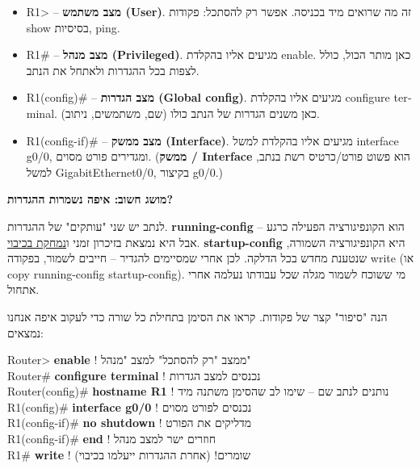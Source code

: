 \documentclass[11pt]{article}
\newcommand{\enLR}[1]{\textenglish{#1}}
\newcommand{\code}[1]{\textenglish{\codefont #1}}
\newcommand{\boxtitle}[1]{{\bfseries\color{boxti}#1}}
\newenvironment{tipbox}{\colorlet{boxti}{tipti}\begin{mdframed}[backgroundcolor=tipbg,linecolor=tipfr,rightline=true,leftline=false,topline=false,bottomline=false,linewidth=2pt,innertopmargin=6pt,innerbottommargin=6pt,innerleftmargin=8pt,innerrightmargin=8pt,skipabove=6pt,skipbelow=6pt]}{\end{mdframed}}
\begin{document}
\begin{itemize}
\item \code{R1>} – \textbf{מצב משתמש \enLR{(User)}}. זה מה שרואים מיד בכניסה. אפשר רק להסתכל: פקודות \code{show} בסיסיות, \code{ping}.
\item \code{R1\#} – \textbf{מצב מנהל \enLR{(Privileged)}}. מגיעים אליו בהקלדת \code{enable}. כאן מותר הכול, כולל לצפות בכל ההגדרות ולאתחל את הנתב.
\item \code{R1(config)\#} – \textbf{מצב הגדרות \enLR{(Global config)}}. מגיעים אליו בהקלדת \code{configure terminal}. כאן משנים הגדרות של הנתב כולו (שם, משתמשים, ניתוב).
\item \code{R1(config-if)\#} – \textbf{מצב ממשק \enLR{(Interface)}}. מגיעים אליו בהקלדת למשל \code{interface g0/0}, ומגדירים פורט מסוים. (\textbf{ממשק / \enLR{Interface}} הוא פשוט פורט/כרטיס רשת בנתב, למשל \enLR{GigabitEthernet0/0}, בקיצור \enLR{g0/0.)}
\end{itemize}

\begin{tipbox}\boxtitle{מושג חשוב: איפה נשמרות ההגדרות?}\par  לנתב יש שני "עותקים" של ההגדרות. \textbf{\enLR{running-config}} הוא הקונפיגורציה הפעילה כרגע – אבל היא נמצאת בזיכרון זמני ו\underline{נמחקת בכיבוי}. \textbf{\enLR{startup-config}} היא הקונפיגורציה השמורה, שנטענת מחדש בכל הדלקה. לכן אחרי שמסיימים להגדיר – חייבים לשמור, בפקודה \code{write} (או \code{copy running-config startup-config}). מי ששוכח לשמור מגלה שכל עבודתו נעלמה אחרי אתחול.\end{tipbox}

הנה "סיפור" קצר של פקודות. קראו את הסימן בתחילת כל שורה כדי לעקוב איפה אנחנו נמצאים:\par

\begin{codebox}\begin{english}\codefont\footnotesize\color{cfg}\setlength{\parindent}{0pt}
Router> \textcolor{cbold}{\textbf{enable}}                 \textcolor{ccom}{\texthebrew{! ממצב "רק להסתכל" למצב "מנהל"}}\\
Router\# \textcolor{cbold}{\textbf{configure terminal}}     \textcolor{ccom}{\texthebrew{! נכנסים למצב הגדרות}}\\
Router(config)\# \textcolor{cbold}{\textbf{hostname R1}}    \textcolor{ccom}{\texthebrew{! נותנים לנתב שם – שימו לב שהסימן משתנה מיד}}\\
R1(config)\# \textcolor{cbold}{\textbf{interface g0/0}}     \textcolor{ccom}{\texthebrew{! נכנסים לפורט מסוים}}\\
R1(config-if)\# \textcolor{cbold}{\textbf{no shutdown}}     \textcolor{ccom}{\texthebrew{! מדליקים את הפורט}}\\
R1(config-if)\# \textcolor{cbold}{\textbf{end}}             \textcolor{ccom}{\texthebrew{! חוזרים ישר למצב מנהל}}\\
R1\# \textcolor{cbold}{\textbf{write}}                       \textcolor{ccom}{\texthebrew{! שומרים! (אחרת ההגדרות ייעלמו בכיבוי)}}
\end{english}\end{codebox}
\end{document}
